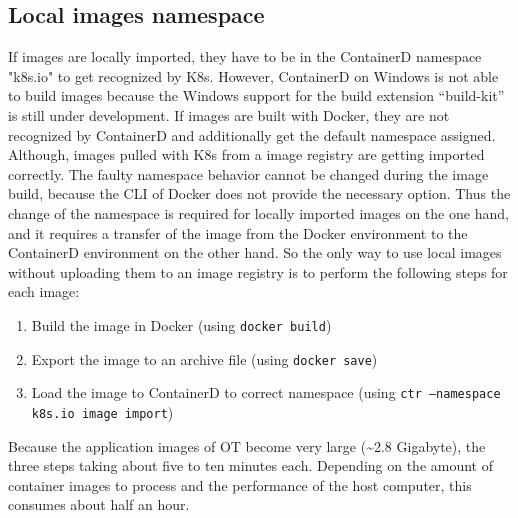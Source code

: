 \subsection{Local images namespace}
If images are locally imported, they have to be in the ContainerD namespace "k8s.io" to get recognized by \ac{K8s}. However, ContainerD on \ac{Windows} is not able to build images because the \ac{Windows} support for the build extension \enquote{build-kit} is still under development\cite{Microsoft.20221225}. If images are built with Docker, they are not recognized by ContainerD and additionally get the default namespace assigned. Although, images pulled with \ac{K8s} from a image registry are getting imported correctly. The faulty namespace behavior cannot be changed during the image build, because the \ac{CLI} of Docker does not provide the necessary option. Thus the change of the namespace is required for locally imported images on the one hand, and it requires a transfer of the image from the Docker environment to the ContainerD environment on the other hand.
So the only way to use local images without uploading them to an image registry is to perform the following steps for each image:
\begin{enumerate}
	\item Build the image in Docker (using \texttt{docker build})
	\item Export the image to an archive file (using \texttt{docker save})
	\item Load the image to ContainerD to correct namespace (using \texttt{ctr --namespace k8s.io image import})
\end{enumerate}
Because the application images of \ac{OT} become very large (\~{}2.8 Gigabyte), the three steps taking about five to ten minutes each. Depending on the amount of container images to process and the performance of the host computer, this consumes about half an hour.

